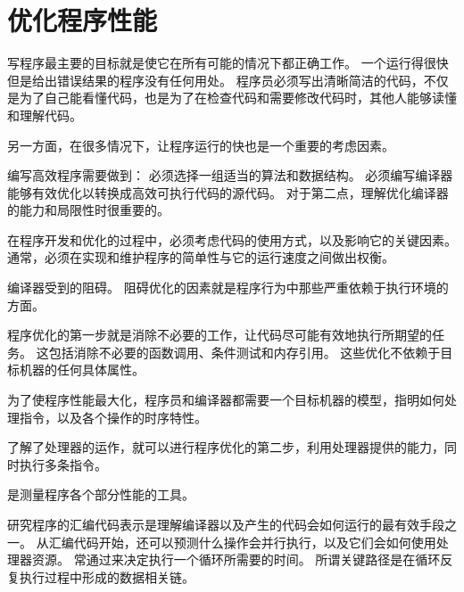 
\chapter{优化程序性能}
{
    写程序最主要的目标就是使它在所有可能的情况下都正确工作。
    一个运行得很快但是给出错误结果的程序没有任何用处。
    程序员必须写出清晰简洁的代码，不仅是为了自己能看懂代码，也是为了在检查代码和需要修改代码时，其他人能够读懂和理解代码。

    另一方面，在很多情况下，让程序运行的快也是一个重要的考虑因素。

    编写高效程序需要做到：
    必须选择一组适当的算法和数据结构。
    必须编写编译器能够有效优化以转换成高效可执行代码的源代码。
    对于第二点，理解优化编译器的能力和局限性时很重要的。

    在程序开发和优化的过程中，必须考虑代码的使用方式，以及影响它的关键因素。
    通常，必须在实现和维护程序的简单性与它的运行速度之间做出权衡。

    编译器受到的阻碍。
    阻碍优化的因素就是程序行为中那些严重依赖于执行环境的方面。

    程序优化的第一步就是消除不必要的工作，让代码尽可能有效地执行所期望的任务。
    这包括消除不必要的函数调用、条件测试和内存引用。
    这些优化不依赖于目标机器的任何具体属性。

    为了使程序性能最大化，程序员和编译器都需要一个目标机器的模型，指明如何处理指令，以及各个操作的时序特性。

    了解了处理器的运作，就可以进行程序优化的第二步，利用处理器提供的能力，同时执行多条指令。

    是测量程序各个部分性能的工具。

    研究程序的汇编代码表示是理解编译器以及产生的代码会如何运行的最有效手段之一。
    从汇编代码开始，还可以预测什么操作会并行执行，以及它们会如何使用处理器资源。
    常通过来决定执行一个循环所需要的时间。
    所谓关键路径是在循环反复执行过程中形成的数据相关链。

    
    
    
    
    
    
    
    
    
    
    
    
    
    
    
}

\cleardoublepage

\endinput
